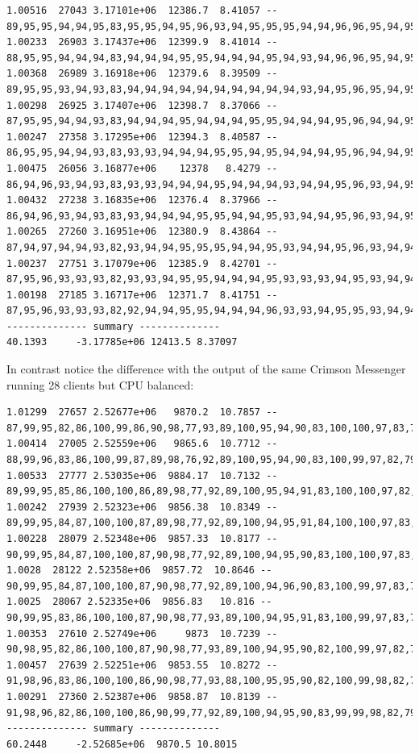 {\small
\begin{verbatim}
1.00516  27043 3.17101e+06  12386.7  8.41057 -- 89,95,95,94,94,95,83,95,95,94,95,96,93,94,95,95,95,94,94,96,96,95,94,95,95,95,95,96,
1.00233  26903 3.17437e+06  12399.9  8.41014 -- 88,95,95,94,94,94,83,94,94,94,95,95,94,94,94,95,94,93,94,96,96,95,94,95,95,95,94,95,
1.00368  26989 3.16918e+06  12379.6  8.39509 -- 89,95,95,93,94,93,83,94,94,94,94,94,94,94,94,94,94,93,94,95,96,95,94,95,95,95,94,95,
1.00298  26925 3.17407e+06  12398.7  8.37066 -- 87,95,95,94,94,93,83,94,94,94,95,94,94,94,95,95,94,94,94,95,96,94,94,95,95,94,94,95,
1.00247  27358 3.17295e+06  12394.3  8.40587 -- 86,95,95,94,94,93,83,93,93,94,94,94,95,95,94,95,94,94,94,95,96,94,94,95,95,94,95,96,
1.00475  26056 3.16877e+06    12378   8.4279 -- 86,94,96,93,94,93,83,93,93,94,94,94,95,94,94,94,93,94,94,95,96,93,94,95,94,94,94,96,
1.00432  27238 3.16835e+06  12376.4  8.37966 -- 86,94,96,93,94,93,83,93,94,94,94,95,95,94,94,95,93,94,94,95,96,93,94,95,94,94,94,96,
1.00265  27260 3.16951e+06  12380.9  8.43864 -- 87,94,97,94,94,93,82,93,94,94,95,95,95,94,94,95,93,94,94,95,96,93,94,94,95,94,95,96,
1.00237  27751 3.17079e+06  12385.9  8.42701 -- 87,95,96,93,93,93,82,93,93,94,95,95,94,94,94,95,93,93,93,94,95,93,94,94,95,95,95,96,
1.00198  27185 3.16717e+06  12371.7  8.41751 -- 87,95,96,93,93,93,82,92,94,94,95,95,94,94,94,96,93,93,94,95,95,93,94,94,95,95,95,96,
-------------- summary --------------
40.1393     -3.17785e+06 12413.5 8.37097
\end{verbatim}
}

In contrast notice the difference with the output of the same Crimson Messenger
running 28 clients but CPU balanced:
{\small
\begin{verbatim}
1.01299  27657 2.52677e+06   9870.2  10.7857 -- 87,99,95,82,86,100,99,86,90,98,77,93,89,100,95,94,90,83,100,100,97,83,79,91,76,94,92,95,
1.00414  27005 2.52559e+06   9865.6  10.7712 -- 88,99,96,83,86,100,99,87,89,98,76,92,89,100,95,94,90,83,100,99,97,82,79,91,76,93,92,94,
1.00533  27777 2.53035e+06  9884.17  10.7132 -- 89,99,95,85,86,100,100,86,89,98,77,92,89,100,95,94,91,83,100,100,97,82,79,91,76,94,93,95,
1.00242  27939 2.52323e+06  9856.38  10.8349 -- 89,99,95,84,87,100,100,87,89,98,77,92,89,100,94,95,91,84,100,100,97,83,79,91,76,94,93,95,
1.00228  28079 2.52348e+06  9857.33  10.8177 -- 90,99,95,84,87,100,100,87,90,98,77,92,89,100,94,95,90,83,100,100,97,83,79,90,76,95,93,96,
1.0028  28122 2.52358e+06  9857.72  10.8646 -- 90,99,95,84,87,100,100,87,90,98,77,92,89,100,94,96,90,83,100,99,97,83,79,90,75,94,93,96,
1.0025  28067 2.52335e+06  9856.83   10.816 -- 90,99,95,83,86,100,100,87,90,98,77,93,89,100,94,95,91,83,100,99,97,83,79,90,75,94,93,96,
1.00353  27610 2.52749e+06     9873  10.7239 -- 90,98,95,82,86,100,100,87,90,98,77,93,89,100,94,95,90,82,100,99,97,82,79,90,75,94,92,96,
1.00457  27639 2.52251e+06  9853.55  10.8272 -- 91,98,96,83,86,100,100,86,90,98,77,93,88,100,95,95,90,82,100,99,98,82,79,90,76,94,92,95,
1.00291  27360 2.52387e+06  9858.87  10.8139 -- 91,98,96,82,86,100,100,86,90,99,77,92,89,100,94,95,90,83,99,99,98,82,79,91,76,94,92,95,
-------------- summary --------------
60.2448     -2.52685e+06  9870.5 10.8015
\end{verbatim}
}

